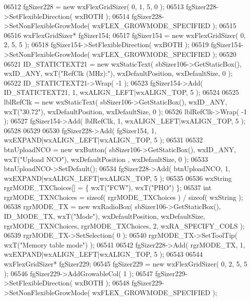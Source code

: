 \begin{DoxyCode}
06512     fgSizer228 = \textcolor{keyword}{new} wxFlexGridSizer( 0, 1, 5, 0 );
06513     fgSizer228->SetFlexibleDirection( wxBOTH );
06514     fgSizer228->SetNonFlexibleGrowMode( wxFLEX\_GROWMODE\_SPECIFIED );
06515     
06516     wxFlexGridSizer* fgSizer154;
06517     fgSizer154 = \textcolor{keyword}{new} wxFlexGridSizer( 0, 2, 5, 5 );
06518     fgSizer154->SetFlexibleDirection( wxBOTH );
06519     fgSizer154->SetNonFlexibleGrowMode( wxFLEX\_GROWMODE\_SPECIFIED );
06520     
06521     ID_STATICTEXT21 = \textcolor{keyword}{new} wxStaticText( sbSizer106->GetStaticBox(), wxID\_ANY, wxT(\textcolor{stringliteral}{"RefClk (MHz):"}), 
      wxDefaultPosition, wxDefaultSize, 0 );
06522     ID_STATICTEXT21->Wrap( -1 );
06523     fgSizer154->Add( ID_STATICTEXT21, 1, wxALIGN\_LEFT|wxALIGN\_TOP, 5 );
06524     
06525     lblRefClk = \textcolor{keyword}{new} wxStaticText( sbSizer106->GetStaticBox(), wxID\_ANY, wxT(\textcolor{stringliteral}{"30.72"}), wxDefaultPosition, 
      wxDefaultSize, 0 );
06526     lblRefClk->Wrap( -1 );
06527     fgSizer154->Add( lblRefClk, 1, wxALIGN\_LEFT|wxALIGN\_TOP, 5 );
06528     
06529     
06530     fgSizer228->Add( fgSizer154, 1, wxEXPAND|wxALIGN\_LEFT|wxALIGN\_TOP, 5 );
06531     
06532     btnUploadNCO = \textcolor{keyword}{new} wxButton( sbSizer106->GetStaticBox(), wxID\_ANY, wxT(\textcolor{stringliteral}{"Upload NCO"}), wxDefaultPosition
      , wxDefaultSize, 0 );
06533     btnUploadNCO->SetDefault(); 
06534     fgSizer228->Add( btnUploadNCO, 1, wxEXPAND|wxALIGN\_LEFT|wxALIGN\_TOP, 5 );
06535     
06536     wxString rgrMODE\_TXChoices[] = \{ wxT(\textcolor{stringliteral}{"FCW"}), wxT(\textcolor{stringliteral}{"PHO"}) \};
06537     \textcolor{keywordtype}{int} rgrMODE\_TXNChoices = \textcolor{keyword}{sizeof}( rgrMODE\_TXChoices ) / \textcolor{keyword}{sizeof}( wxString );
06538     rgrMODE_TX = \textcolor{keyword}{new} wxRadioBox( sbSizer106->GetStaticBox(), ID_MODE_TX, wxT(\textcolor{stringliteral}{"Mode"}), wxDefaultPosition, 
      wxDefaultSize, rgrMODE\_TXNChoices, rgrMODE\_TXChoices, 2, wxRA\_SPECIFY\_COLS );
06539     rgrMODE_TX->SetSelection( 0 );
06540     rgrMODE_TX->SetToolTip( wxT(\textcolor{stringliteral}{"Memory table mode"}) );
06541     
06542     fgSizer228->Add( rgrMODE_TX, 1, wxEXPAND|wxALIGN\_LEFT|wxALIGN\_TOP, 5 );
06543     
06544     wxFlexGridSizer* fgSizer229;
06545     fgSizer229 = \textcolor{keyword}{new} wxFlexGridSizer( 0, 2, 5, 5 );
06546     fgSizer229->AddGrowableCol( 1 );
06547     fgSizer229->SetFlexibleDirection( wxBOTH );
06548     fgSizer229->SetNonFlexibleGrowMode( wxFLEX\_GROWMODE\_SPECIFIED );

\end{DoxyCode}
